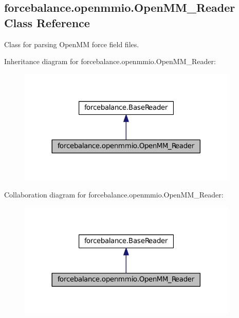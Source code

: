 \hypertarget{classforcebalance_1_1openmmio_1_1OpenMM__Reader}{\subsection{forcebalance.\-openmmio.\-Open\-M\-M\-\_\-\-Reader \-Class \-Reference}
\label{classforcebalance_1_1openmmio_1_1OpenMM__Reader}
}


\-Class for parsing \-Open\-M\-M force field files.  




\-Inheritance diagram for forcebalance.\-openmmio.\-Open\-M\-M\-\_\-\-Reader\-:\nopagebreak
\begin{figure}[H]
\begin{center}
\leavevmode
\includegraphics[width=296pt]{classforcebalance_1_1openmmio_1_1OpenMM__Reader__inherit__graph}
\end{center}
\end{figure}


\-Collaboration diagram for forcebalance.\-openmmio.\-Open\-M\-M\-\_\-\-Reader\-:\nopagebreak
\begin{figure}[H]
\begin{center}
\leavevmode
\includegraphics[width=296pt]{classforcebalance_1_1openmmio_1_1OpenMM__Reader__coll__graph}
\end{center}
\end{figure}
